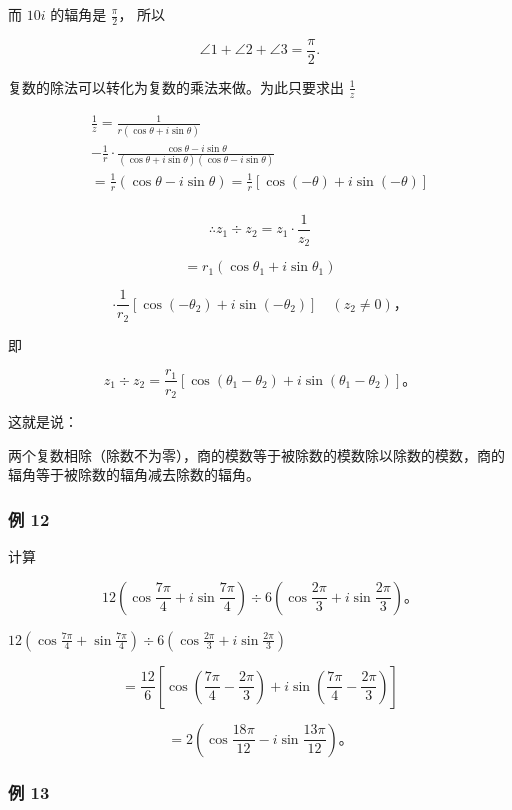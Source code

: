而 \(10i\) 的辐角是 \(\frac{\pi}{2}\)， 所以

\[
\angle 1 + \angle 2 + \angle 3 = \frac {\pi}{2}.
\]

复数的除法可以转化为复数的乘法来做。为此只要求出 \(\frac{1}{z}\)

\[
\begin{array}{l} \frac {1}{z} = \frac {1}{r (\cos \theta + i \sin \theta)} \\ - \frac {1}{r} \cdot \frac {\cos \theta - i \sin \theta}{(\cos \theta + i \sin \theta) (\cos \theta - i \sin \theta)} \\ = \frac {1}{r} (\cos \theta - i \sin \theta) = \frac {1}{r} [ \cos (- \theta) + i \sin (- \theta) ] \\ \end{array}
\]

\[
\therefore z _ {1} \div z _ {2} = z _ {1} \cdot \frac {1}{z _ {2}}
\]

\[
= r_1 (\cos \theta_ {1} + i \sin \theta_ {1})
\]

\[
\cdot \frac {1}{r _ {2}} [ \cos (- \theta_ {2}) + i \sin (- \theta_ {2}) ] \quad (z _ {2} \neq 0)\text{，}
\]

即

\[
z _ {1} \div z _ {2} = \frac {r _ {1}}{r _ {2}} [ \cos (\theta_ {1} - \theta_ {2}) + i \sin (\theta_ {1} - \theta_ {2}) ]\text{。}
\]

这就是说：

两个复数相除（除数不为零），商的模数等于被除数的模数除以除数的模数，商的辐角等于被除数的辐角减去除数的辐角。

\subsubsection{例 12}

计算

\[
12 \left(\cos \frac {7 \pi}{4} + i \sin \frac {7 \pi}{4}\right) \div 6 \left(\cos \frac {2 \pi}{3} + i \sin \frac {2 \pi}{3}\right)\text{。}
\]

\(12\left(\cos \frac{7\pi}{4} + \sin \frac{7\pi}{4}\right) \div 6\left(\cos \frac{2\pi}{3} + i\sin \frac{2\pi}{3}\right)\)

\[
= \frac {12}{6} \left[ \cos \left(\frac {7 \pi}{4} - \frac {2 \pi}{3}\right) + i \sin \left(\frac {7 \pi}{4} - \frac {2 \pi}{3}\right) \right]
\]

\[
= 2 \left(\cos \frac {18 \pi}{12} - i \sin \frac {13 \pi}{12}\right)\text{。}
\]

\subsubsection{例 13}

